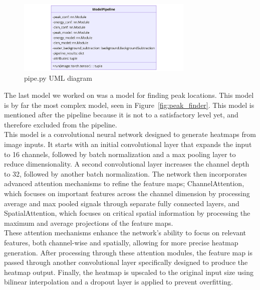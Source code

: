 \documentclass[12pt]{article}
\begin{document}
\begin{figure}[H]
    \centering
    \includegraphics[width=0.75\textwidth]{uml_diagrams/pipe_uml.png}
    \caption{pipe.py UML diagram}
    \label{fig:pipe}
\end{figure}

The last model we worked on was a model for finding peak locations. This model is by far the most complex model, seen in Figure~\ref{fig:peak_finder}. This model is mentioned after the pipeline because it is not to a satisfactory level yet, and therefore excluded from the pipeline.\\

This model is a convolutional neural network designed to generate heatmaps from image inputs. It starts with an initial convolutional layer that expands the input to 16 channels, followed by batch normalization and a max pooling layer to reduce dimensionality. A second convolutional layer increases the channel depth to 32, followed by another batch normalization. The network then incorporates advanced attention mechanisms to refine the feature maps; ChannelAttention, which focuses on important features across the channel dimension by processing average and max pooled signals through separate fully connected layers, and SpatialAttention, which focuses on critical spatial information by processing the maximum and average projections of the feature maps.\\

These attention mechanisms enhance the network's ability to focus on relevant features, both channel-wise and spatially, allowing for more precise heatmap generation. After processing through these attention modules, the feature map is passed through another convolutional layer specifically designed to produce the heatmap output. Finally, the heatmap is upscaled to the original input size using bilinear interpolation and a dropout layer is applied to prevent overfitting.\\
\end{document}
